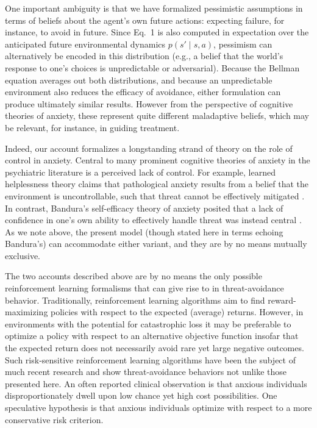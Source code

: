 \documentclass[11pt]{article} %
\begin{document}
One important ambiguity is that we have formalized pessimistic assumptions in terms of beliefs about the agent's own future actions: expecting failure, for instance, to avoid in future. Since Eq.~1 is also computed in expectation over the anticipated future environmental dynamics $p(s' \mid s,a)$, pessimism can alternatively be encoded in this distribution (e.g., a belief that the world's response to one's choices is unpredictable or adversarial). Because the Bellman equation averages out both distributions, and because an unpredictable environment also reduces the efficacy of avoidance, either formulation can produce ultimately similar results. However from the perspective of cognitive theories of anxiety, these represent quite different maladaptive beliefs, which may be relevant, for instance, in guiding treatment.

Indeed, our account formalizes a longstanding strand of theory on the role of control in anxiety. Central to many prominent cognitive theories of anxiety in the psychiatric literature is a perceived lack of control. For example, learned helplessness theory claims that pathological anxiety results from a belief that the environment is uncontrollable, such that threat cannot be effectively mitigated \cite{alloy1990}. In contrast, Bandura's self-efficacy theory of anxiety posited that a lack of confidence in one's own ability to effectively handle threat was instead central \cite{bandura1977}. As we note above, the present model (though stated here in terms echoing Bandura's) can accommodate either variant, and they are by no means mutually exclusive.


The two accounts described above are by no means the only possible reinforcement learning formalisms that can give rise to in threat-avoidance behavior. Traditionally, reinforcement learning algorithms aim to find reward-maximizing policies with respect to the expected (average) returns. However, in environments with the potential for catastrophic loss it may be preferable to optimize a policy with respect to an alternative objective function insofar that the expected return does not necessarily avoid rare yet large negative outcomes. Such risk-sensitive reinforcement learning algorithms have been the subject of much recent research \cite{geibel2005, morimura2012} and show threat-avoidance behaviors not unlike those presented here. An often reported clinical observation is that anxious individuals disproportionately dwell upon low chance yet high cost possibilities. \cite{Miceli2005} One speculative hypothesis is that anxious individuals optimize with respect to a more conservative risk criterion. 
\end{document}

